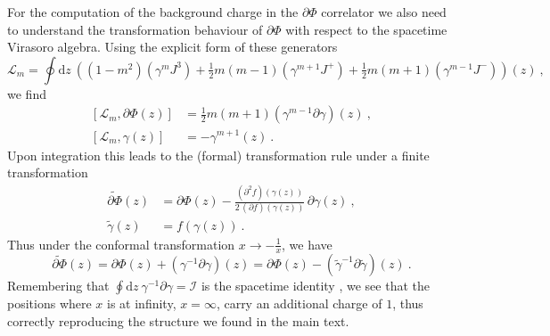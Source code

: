 \documentclass[12pt,a4paper]{article}
\newcommand{\be}{\begin{equation}}
\newcommand{\ee}{\end{equation}}
\begin{document}
For the computation of the background charge in the $\partial \Phi$ correlator we also need to understand the transformation behaviour of $\partial \Phi$ with respect to the spacetime Virasoro algebra. Using the explicit form of these generators \cite{Giveon:1998ns} 
\be 
\mathcal{L}_m=\oint \mathrm{d}z\ \left((1-m^2) (\gamma^m J^3)+\tfrac{1}{2}m(m-1)(\gamma^{m+1} J^+)+\tfrac{1}{2}m(m+1)(\gamma^{m-1} J^-)\right)(z) \ , 
\ee
we find 
\begin{subequations}
\begin{align} 
[\mathcal{L}_m,\partial \Phi(z)]&=\frac{1}{2}m(m+1) (\gamma^{m-1}\partial \gamma)(z)\ ,\\
[\mathcal{L}_m,\gamma(z)]&=-\gamma^{m+1}(z)\ .
\end{align}
\end{subequations}
Upon integration this leads to the (formal) transformation rule under a finite transformation 
\begin{subequations}
\begin{align} 
\widetilde{\partial \Phi}(z)&=\partial \Phi(z)-\frac{(\partial^2 f)(\gamma(z))}{2\,(\partial f)(\gamma(z))} \, \partial \gamma(z)\ , \\
\widetilde{\gamma}(z)&=f(\gamma(z))\ .
\end{align}
\end{subequations}
Thus under the conformal transformation $x \to -\tfrac{1}{x}$, we have
\be 
\widetilde{\partial \Phi}(z)=\partial \Phi(z)+ (\gamma^{-1}\partial \gamma)(z)=\partial \Phi(z)- (\widetilde{\gamma}^{-1}\partial \widetilde{\gamma})(z)\ .
\ee
Remembering that $\oint \mathrm{d}z\ \gamma^{-1}\partial \gamma=\mathcal{I}$ is the spacetime identity \cite{Giveon:1998ns, Eberhardt:2019qcl}, we see that the positions where $x$ is at infinity, $x=\infty$, carry an additional charge of $1$, thus correctly reproducing the structure we found in the main text.
\end{document}
